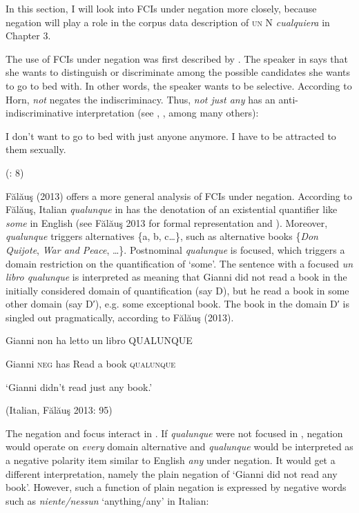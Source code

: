 In this section, I will look into FCIs under negation more closely, because negation will play a role in the corpus data description of \textsc{un} N \textit{cualquiera} in Chapter 3.

  The use of FCIs under negation was first described by \citet{Horn2000}. The speaker in  says that she wants to distinguish or discriminate among the possible candidates she wants to go to bed with. In other words, the speaker wants to be selective. According to Horn, \textit{not} negates the indiscriminacy. Thus, \textit{not just any} has an anti-indiscriminative interpretation (see \citealt{Horn2000}, \citealt{AloniPort2013}, among many others):

\label{bkm:Ref42805181}  I don’t want to go to bed with just anyone anymore. I have to be attracted to them sexually.

  (\citealt{AloniEtAl2011}: 8)

Fălăuş (2013) offers a more general analysis of FCIs under negation. According to Fălăuş, Italian \textit{qualunque} in  has the denotation of an existential quantifier like \textit{some} in English (see Fălăuş 2013 for formal representation and ). Moreover, \textit{qualunque} triggers alternatives \{a, b, c…\}, such as alternative books \{\textit{Don Quijote}, \textit{War and Peace}, …\}. Postnominal \textit{qualunque} is focused, which triggers a domain restriction on the quantification of ‘some’. The sentence with a focused \textit{un libro qualunque} is interpreted as meaning that Gianni did not read a book in the initially considered domain of quantification (say D), but he read a book in some other domain (say D′), e.g. some exceptional book. The book in the domain D′ is singled out pragmatically, according to Fălăuş (2013).

\label{bkm:Ref42805226}  Gianni  non  ha  letto  un  libro  \MakeUppercase{qualunque}

  Gianni  \textsc{neg}  has  Read  a  book  \textsc{qualunque}

  ‘Gianni didn’t read just any book.’

  (Italian, Fălăuş 2013: 95)

The negation and focus interact in . If \textit{qualunque} were not focused in , negation would operate on \textit{every} domain alternative and \textit{qualunque} would be interpreted as a negative polarity item similar to English \textit{any} under negation. It would get a different interpretation, namely the plain negation of ‘Gianni did not read any book’. However, such a function of plain negation is expressed by negative words such as \textit{niente/nessun} ‘anything/any’ in Italian:


